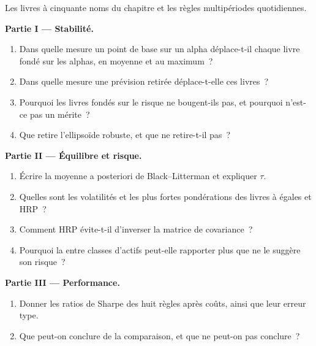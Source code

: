 \begin{problem}\label{pb:rs:portfolio-construction-ii:1}
Les livres à cinquante noms du chapitre et les règles multipériodes quotidiennes.

\medskip\noindent\textbf{Partie I --- Stabilité.}
\begin{enumerate}
\item Dans quelle mesure un point de base sur un alpha déplace-t-il chaque livre fondé sur les alphas, en moyenne et au maximum~?
\item Dans quelle mesure une prévision retirée déplace-t-elle ces livres~?
\item Pourquoi les livres fondés sur le risque ne bougent-ils pas, et pourquoi n'est-ce pas un mérite~?
\item Que retire l'ellipsoïde robuste, et que ne retire-t-il pas~?
\end{enumerate}

\medskip\noindent\textbf{Partie II --- Équilibre et risque.}
\begin{enumerate}[resume]
\item Écrire la moyenne a posteriori de Black--Litterman et expliquer $\tau$.
\item Quelles sont les volatilités et les plus fortes pondérations des livres à  égales et HRP~?
\item Comment HRP évite-t-il d'inverser la matrice de covariance~?
\item Pourquoi la  entre classes d'actifs peut-elle rapporter plus que ne le suggère son risque~?
\end{enumerate}

\medskip\noindent\textbf{Partie III --- Performance.}
\begin{enumerate}[resume]
\item Donner les ratios de Sharpe des huit règles après coûts, ainsi que leur erreur type.
\item Que peut-on conclure de la comparaison, et que ne peut-on pas conclure~?
\end{enumerate}


\end{problem}
